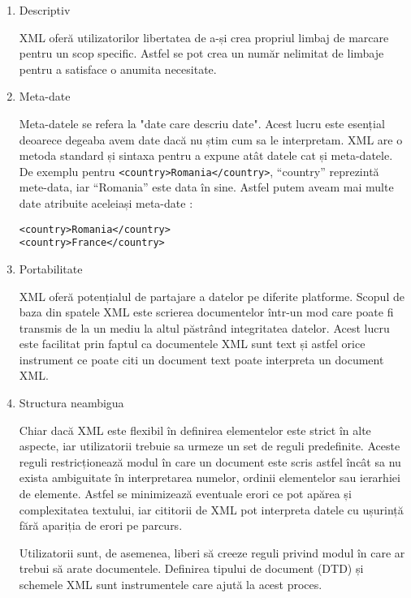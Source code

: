 \begin{enumerate}[wide=0pt, listparindent=1.25em, parsep=1pt]
\item Descriptiv

XML oferă utilizatorilor libertatea de a-și crea propriul limbaj de marcare pentru un scop specific.
Astfel se pot crea un număr nelimitat de limbaje pentru a satisface o anumita necesitate.

\item Meta-date

Meta-datele se refera la "date care descriu date". 
Acest lucru este esențial deoarece degeaba avem date dacă nu știm cum sa le interpretam. 
XML are o metoda standard și sintaxa pentru a expune atât datele cat și meta-datele. 
De exemplu pentru \verb|<country>Romania</country>|, “country” reprezintă mete-data, iar “Romania” este data în sine. 
Astfel putem aveam mai multe date atribuite aceleiași meta-date \cite{xml2}:

\lstset{language=XML}
\begin{lstlisting} 
<country>Romania</country>
<country>France</country>
\end{lstlisting}

\item Portabilitate

XML oferă potențialul de partajare a datelor pe diferite platforme. 
Scopul de baza din spatele XML este scrierea documentelor într-un mod care poate fi transmis de la un mediu la altul păstrând 
integritatea datelor. Acest lucru este facilitat prin faptul ca documentele XML sunt text și astfel orice instrument ce poate 
citi un document text poate interpreta un document XML. 

\item Structura neambigua

Chiar dacă XML este flexibil în definirea elementelor este strict în alte aspecte, 
iar utilizatorii trebuie sa urmeze un set de reguli predefinite. 
Aceste reguli restricționează modul în care un document este scris astfel încât sa nu exista ambiguitate în interpretarea numelor, 
ordinii elementelor sau ierarhiei de elemente. Astfel se minimizează eventuale erori ce pot apărea și complexitatea textului, 
iar cititorii de XML pot interpreta datele cu ușurință fără apariția de erori pe parcurs.\newline 

Utilizatorii sunt, de asemenea, liberi să creeze reguli privind modul în care ar trebui să arate documentele.
Definirea tipului de document (DTD) și schemele XML sunt instrumentele care ajută la acest
proces.
\end{enumerate}

